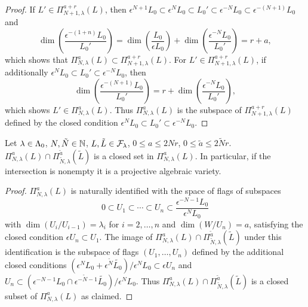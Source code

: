 \documentclass[a4paper, 11pt]{report}
\begin{document}
\begin{proof}
If $L'\in\Pi_{N+1,\lambda}^{a+r}(L)$, then $\epsilon^{N+1}L_0\subset \epsilon^N L_0\subset L_0'\subset\epsilon^{-N}L_0\subset\epsilon^{-(N+1)}L_0$ and
\begin{equation*}
\dim\left(\frac{\epsilon^{-(1+n)}L_0}{L_0'}\right) = \dim\left(\frac{L_0}{\epsilon L_0}\right) + \dim\left(\frac{\epsilon^{-N}L_0}{L_0'}\right) = r+a,
\end{equation*}
which shows that $\Pi_{N,\lambda}^a(L)\subset \Pi_{N+1,\lambda}^{a+r}(L)$. For $L'\in\Pi_{N+1,\lambda}^{a+r}(L)$, if additionally $\epsilon^N L_0\subset L_0'\subset\epsilon^{-N}L_0$, then
\begin{equation*}
\dim\left(\frac{\epsilon^{-(N+1)}L_0}{L_0'}\right) = r + \dim\left(\frac{\epsilon^{-N}L_0}{L_0'}\right),
\end{equation*}
which shows $L'\in\Pi_{N,\lambda}^a(L)$. Thus $\Pi_{N,\lambda}^a(L)$ is the subspace of $\Pi_{N+1,\lambda}^{a+r}(L)$ defined by the closed condition $\epsilon^N L_0\subset L_0'\subset\epsilon^{-N}L_0$.
\end{proof}

\begin{lemma}
Let $\lambda\in{\Lambda_0}$, $N,\tilde{N}\in\mathbb{N}$, $L,\tilde{L}\in\mathcal{F}_\lambda$, $0\le a\le 2Nr$, $0\le\tilde{a}\le2\tilde{N}r$. $\Pi_{N,\lambda}^a(L)\cap \Pi_{\tilde{N},\lambda}^{\tilde{a}}(\tilde{L})$ is a closed set in $\Pi_{N,\lambda}^a(L)$. In particular, if the intersection is nonempty it is a projective algebraic variety.
\end{lemma}

\begin{proof}
$\Pi_{N,\lambda}^a(L)$ is naturally identified with the space of flags of subspaces
\begin{equation*}
0\subset U_1\subset \cdots\subset U_n\subset \frac{\epsilon^{-N-1}L_0}{\epsilon^N L_0}
\end{equation*}
with $\dim(U_i/{U_{i-1}})=\lambda_i$ for $i=2,\ldots,n$ and $\dim(W/{U_n})=a$, satisfying the closed condition $\epsilon U_n\subset U_1$. The image of $\Pi_{N,\lambda}^a(L)\cap \Pi_{\tilde{N},\lambda}^{\tilde{a}}(\tilde{L})$ under this identification is the subspace of flags $(U_1,\ldots,U_n)$ defined by the additional closed conditions ${(\epsilon^N L_0+\epsilon^{\tilde{N}}\tilde{L_0})}/{\epsilon^N L_0}\subset\epsilon U_n$ and $U_n\subset {(\epsilon^{-N-1}L_0\cap \epsilon^{-\tilde{N}-1}\tilde{L_0})}/{\epsilon^N L_0}$. Thus $\Pi_{N,\lambda}^a(L)\cap \Pi_{\tilde{N},\lambda}^{\tilde{a}}(\tilde{L})$ is a closed subset of $\Pi_{N,\lambda}^a(L)$ as claimed.
\end{proof}
\end{document}
